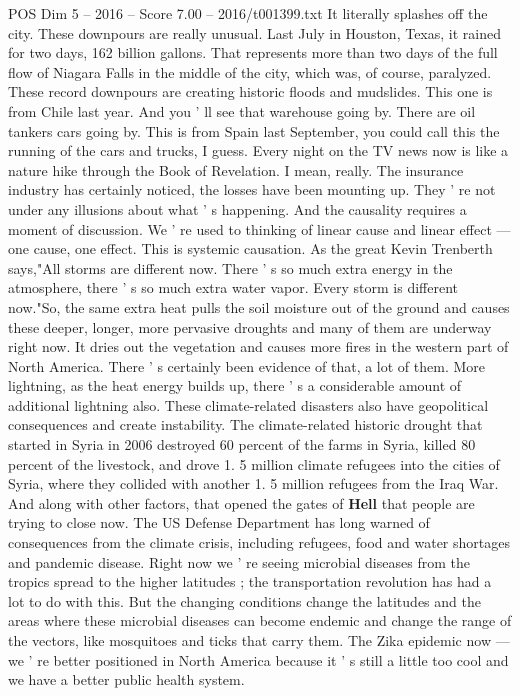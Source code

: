 \begin{textsample}{POS Dim 5 – 2016 – Score 7.00 – 2016/t001399.txt}
It literally splashes off the city.
These downpours are really unusual.
Last July in Houston, Texas, it rained for two days, 162 billion gallons.
That represents more than two days of the full flow of Niagara Falls in the middle of the city, which was, of course, paralyzed.
These record downpours are creating historic floods and mudslides.
This one is from Chile last year.
And you ' ll see that warehouse going by.
There are oil tankers cars going by.
This is from Spain last September, you could call this the running of the cars and trucks, I guess.
Every night on the TV news now is like a nature hike through the Book of Revelation.
I mean, really.
The insurance industry has certainly noticed, the losses have been mounting up.
They ' re not under any illusions about what ' s happening.
And the causality requires a moment of discussion.
We ' re used to thinking of linear cause and linear effect — one cause, one effect.
This is systemic causation.
As the great Kevin Trenberth says,"All storms are different now.
There ' s so much extra energy in the atmosphere, there ' s so much extra water vapor.
Every storm is different now."So, the same extra heat pulls the soil moisture out of the ground and causes these deeper, longer, more pervasive droughts and many of them are underway right now.
It dries out the vegetation and causes more fires in the western part of North America.
There ' s certainly been evidence of that, a lot of them.
More lightning, as the heat energy builds up, there ' s a considerable amount of additional lightning also.
These climate-related disasters also have geopolitical consequences and create instability.
The climate-related historic drought that started in Syria in 2006 destroyed 60 percent of the farms in Syria, killed 80 percent of the livestock, and drove 1. 5 million climate refugees into the cities of Syria, where they collided with another 1. 5 million refugees from the Iraq War.
And along with other factors, that opened the gates of \textbf{Hell} that people are trying to close now.
The US Defense Department has long warned of consequences from the climate crisis, including refugees, food and water shortages and pandemic disease.
Right now we ' re seeing microbial diseases from the tropics spread to the higher latitudes ; the transportation revolution has had a lot to do with this.
But the changing conditions change the latitudes and the areas where these microbial diseases can become endemic and change the range of the vectors, like mosquitoes and ticks that carry them.
The Zika epidemic now — we ' re better positioned in North America because it ' s still a little too cool and we have a better public health system.

\end{textsample}
